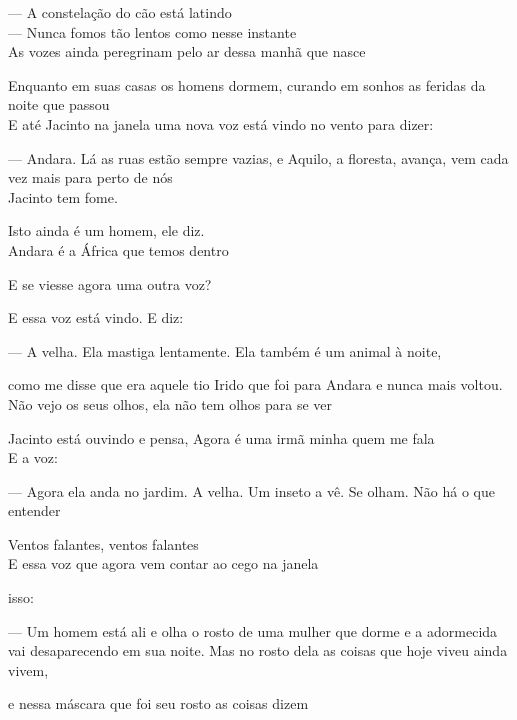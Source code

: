 --- A constelação do cão está latindo\\

--- Nunca fomos tão lentos como nesse instante\\

As vozes ainda peregrinam pelo ar dessa manhã que nasce

Enquanto em suas casas os homens dormem, curando em sonhos as feridas da
noite que passou\\

E até Jacinto na janela uma nova voz está vindo no vento para dizer:

--- Andara. Lá as ruas estão sempre vazias, e Aquilo, a floresta, avança,
vem cada vez mais para perto de nós\\

Jacinto tem fome.

Isto ainda é um homem, ele diz.\\

Andara é a África que temos dentro

\breakk

\vspace*{4cm}

E se viesse agora uma outra voz?

E essa voz está vindo. E diz:

--- A velha. Ela mastiga lentamente. Ela também é um animal à noite,

como me disse que era aquele tio Irido que foi para Andara e nunca mais
voltou. Não vejo os seus olhos, ela não tem olhos para se ver

Jacinto está ouvindo e pensa, Agora é uma irmã minha quem me fala\\

E a voz:

--- Agora ela anda no jardim. A velha. Um inseto a vê. Se olham. Não há o
que entender

\breakk

\vspace*{4cm}

Ventos falantes, ventos falantes\\

E essa voz que agora vem contar ao cego na janela

isso:

--- Um homem está ali e olha o rosto de uma mulher que dorme e a
adormecida vai desaparecendo em sua noite. Mas no rosto dela as coisas
que hoje viveu ainda vivem,

e nessa máscara que foi seu rosto as coisas dizem


